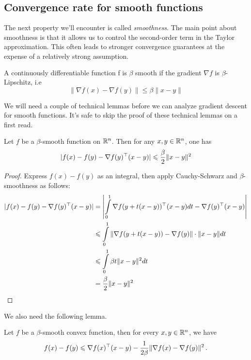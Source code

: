 \subsection{Convergence rate for smooth functions}

The next property we'll encounter is called \emph{smoothness}.  The main point
about smoothness is that it allows us to control the second-order term in the
Taylor approximation. This often leads to stronger convergence guarantees at the
expense of a relatively strong assumption.

\begin{definition}[Smoothness]
A continuously differentiable function f is $\beta$ smooth if the gradient $\nabla f$ is $\beta$-Lipschitz, i.e
$$\|\nabla f(x) - \nabla f(y)\| \leq \beta\|x-y\|$$
\end{definition}

We will need a couple of technical lemmas before we can analyze gradient descent
for smooth functions. It's safe to skip the proof of these technical lemmas on a
first read.

\begin{lemma}\label{l1}
Let $f$ be a $\beta$-smooth function on $\mathbb{R}^n$.  Then for any $x,y \in \mathbb{R}^n$, one has
$$|f(x) - f(y) - \nabla f(y)^\top(x-y)| \leqslant \frac{\beta}{2}\|x-y\|^2$$
\end{lemma}

\begin{proof}
Express $f(x) - f(y)$ as an integral, then apply Cauchy-Schwarz and 
$\beta$-smoothness as follows:
\begin{align*}
|f(x) - f(y) - \nabla f(y)^\top(x-y)|
&=\left|\int\limits_{0}^1 \nabla f(y + t(x-y))^\top(x-y)dt - \nabla
f(y)^\top(x-y)\right|\\
&\leqslant  \int\limits_{0}^1 \|\nabla f(y + t(x-y)) - \nabla f(y)\|\cdot \|x-y\|dt\\
&\leqslant \int\limits_{0}^1 \beta t\|x-y\|^2dt\\
&= \frac{\beta}{2}\|x-y\|^2\qedhere
\end{align*}
\end{proof}

We also need the following lemma.

\begin{lemma} \label{lm2}
Let $f$ be a $\beta$-smooth convex function, then for every $x,y \in \mathbb{R}^n$, we have
$$f(x) - f(y)\leqslant \nabla f(x)^\top(x-y) - 
\frac{1}{2\beta}\|\nabla f(x) - \nabla f(y)\|^2\,.$$
\end{lemma}

